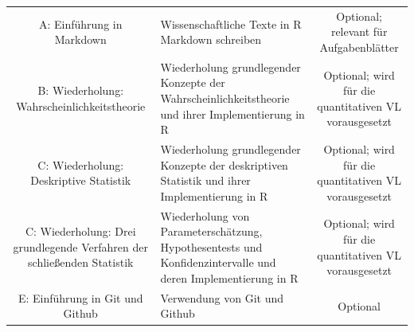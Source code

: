 \documentclass[]{book}
\begin{document}
\begin{longtable}[]{@{}clc@{}}
\begin{minipage}[t]{0.24\columnwidth}
A: Einführung in Markdown\strut
\end{minipage} & \begin{minipage}[t]{0.34\columnwidth}\raggedright\strut
Wissenschaftliche Texte in R Markdown schreiben\strut
\end{minipage} & \begin{minipage}[t]{0.34\columnwidth}\centering\strut
Optional; relevant für Aufgabenblätter\strut
\end{minipage}\tabularnewline
\begin{minipage}[t]{0.24\columnwidth}\centering\strut
B: Wiederholung: Wahrscheinlichkeitstheorie\strut
\end{minipage} & \begin{minipage}[t]{0.34\columnwidth}\raggedright\strut
Wiederholung grundlegender Konzepte der Wahrscheinlichkeitstheorie und
ihrer Implementierung in R\strut
\end{minipage} & \begin{minipage}[t]{0.34\columnwidth}\centering\strut
Optional; wird für die quantitativen VL vorausgesetzt\strut
\end{minipage}\tabularnewline
\begin{minipage}[t]{0.24\columnwidth}\centering\strut
C: Wiederholung: Deskriptive Statistik\strut
\end{minipage} & \begin{minipage}[t]{0.34\columnwidth}\raggedright\strut
Wiederholung grundlegender Konzepte der deskriptiven Statistik und ihrer
Implementierung in R\strut
\end{minipage} & \begin{minipage}[t]{0.34\columnwidth}\centering\strut
Optional; wird für die quantitativen VL vorausgesetzt\strut
\end{minipage}\tabularnewline
\begin{minipage}[t]{0.24\columnwidth}\centering\strut
C: Wiederholung: Drei grundlegende Verfahren der schließenden
Statistik\strut
\end{minipage} & \begin{minipage}[t]{0.34\columnwidth}\raggedright\strut
Wiederholung von Parameterschätzung, Hypothesentests und
Konfidenzintervalle und deren Implementierung in R\strut
\end{minipage} & \begin{minipage}[t]{0.34\columnwidth}\centering\strut
Optional; wird für die quantitativen VL vorausgesetzt\strut
\end{minipage}\tabularnewline
\begin{minipage}[t]{0.24\columnwidth}\centering\strut
E: Einführung in Git und Github\strut
\end{minipage} & \begin{minipage}[t]{0.34\columnwidth}\raggedright\strut
Verwendung von Git und Github\strut
\end{minipage} & \begin{minipage}[t]{0.34\columnwidth}\centering\strut
Optional\strut
\end{minipage}\tabularnewline
\bottomrule
\end{longtable}
\end{document}
